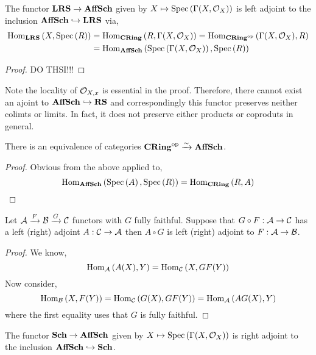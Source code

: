 \documentclass[12pt]{article}
\begin{document}
\begin{lemma}
The functor $\mathbf{LRS} \to \mathbf{AffSch}$ given by $X \mapsto \mathrm{Spec}\left( \Gamma(X, \mathcal{O}_{X}) \right)$ is left adjoint to the inclusion $\mathbf{AffSch} \hookrightarrow \mathbf{LRS}$ via,
\begin{align*}
\mathrm{Hom}_{\mathbf{LRS}} \left( X, \mathrm{Spec}\left( R \right) \right) & = \mathrm{Hom}_{\mathbf{CRing}} \left( R, \Gamma(X, \mathcal{O}_{X}) \right) = \mathrm{Hom}_{\mathbf{CRing}^{\mathrm{op}}} \left( \Gamma(X, \mathcal{O}_{X}), R \right)
\\
& = \mathrm{Hom}_{\mathbf{AffSch}} \left( \mathrm{Spec}\left( \Gamma(X, \mathcal{O}_{X}) \right), \mathrm{Spec}\left( R \right) \right)
\end{align*}
\end{lemma}

\begin{proof}
DO THSI!!!
\end{proof}

\begin{rmk}
Note the locality of $\mathcal{O}_{X, x}$ is essential in the proof. Therefore, there cannot exist an ajoint to $\mathbf{AffSch} \hookrightarrow \mathbf{RS}$ and correspondingly this functor preserves neither colimts or limits. In fact, it does not preserve either products or coproduts in general.
\end{rmk}

\begin{prop}
There is an equivalence of categories $\mathbf{CRing}^{\mathrm{op}} \xrightarrow{\sim} \mathbf{AffSch}$.
\end{prop}

\begin{proof}
Obvious from the above applied to,
\[ \mathrm{Hom}_{\mathbf{AffSch}} \left( \mathrm{Spec}\left( A \right), \mathrm{Spec}\left( R \right) \right) = \mathrm{Hom}_{\mathbf{CRing}} \left( R, A \right) \]
\end{proof}

\begin{lemma}
Let $\mathcal{A} \xrightarrow{F} \mathcal{B} \xrightarrow{G} \mathcal{C}$ functors with $G$ fully faithful. Suppose that $G \circ F : \mathcal{A} \to \mathcal{C}$ has a left (right) adjoint $A : \mathcal{C} \to \mathcal{A}$ then $A \circ G$ is left (right) adjoint to $F : \mathcal{A} \to \mathcal{B}$.
\end{lemma}

\begin{proof}
We know,
\[ \mathrm{Hom}_{\mathcal{A}} \left( A(X), Y \right) = \mathrm{Hom}_{\mathcal{C}} \left( X, GF(Y) \right) \]
Now consider,
\[ \mathrm{Hom}_{\mathcal{B}} \left( X, F(Y) \right) = \mathrm{Hom}_{\mathcal{C}} \left( G(X), GF(Y) \right) = \mathrm{Hom}_{\mathcal{A}} \left( AG(X), Y \right) \]
where the first equality uses that $G$ is fully faithful.
\end{proof}

\begin{cor}
The functor $\mathbf{Sch} \to \mathbf{AffSch}$ given by $X \mapsto \mathrm{Spec}\left( \Gamma(X, \mathcal{O}_{X}) \right)$ is right adjoint to the inclusion $\mathbf{AffSch} \hookrightarrow \mathbf{Sch}$.
\end{cor}
\end{document}
